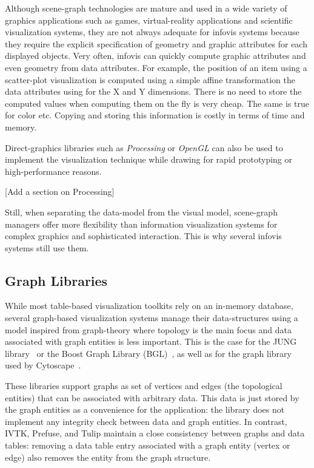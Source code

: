 Although scene-graph technologies are mature and used in a wide
variety of graphics applications such as games, virtual-reality
applications and scientific visualization systems, they are not always
adequate for infovis systems because they require
the explicit specification of geometry and graphic attributes for each
displayed objects.  Very often, infovis can quickly
compute graphic attributes and even geometry from data attributes.
For example, the position of an item using a scatter-plot visualization
is computed using a simple affine transformation the data attributes
using for the X and Y dimensions.  There is no need to store the
computed values when computing them on the fly is very cheap.  The
same is true for color etc.  Copying and storing this information is
costly in terms of time and memory.

Direct-graphics libraries such as \emph{Processing} or \emph{OpenGL}
can also be used to implement the visualization technique while
drawing for rapid prototyping or high-performance reasons.

[Add a section on Processing]

Still, when separating the data-model from the visual model,
scene-graph managers offer more flexibility than information
visualization systems for complex graphics and sophisticated
interaction.  This is why several infovis systems
still use them.


\subsection{Graph Libraries}

While most table-based visualization toolkits rely on an in-memory
database, several graph-based visualization systems manage their
data-structures using a model inspired from graph-theory where
topology is the main focus and data associated with graph entities is
less important.  This is the case for the JUNG library~\cite{jung2003}
or the Boost Graph Library (BGL)~\cite{BGL}, as well as for the graph
library used by Cytoscape~\cite{Cytoscape}.

These libraries support graphs as set of vertices and edges (the
topological entities) that can be associated with arbitrary data.
This data is just stored by the graph entities as a convenience for
the application: the library does not implement any integrity check
between data and graph entities.  In contrast, IVTK, Prefuse, and
Tulip maintain a close consistency between graphs and data tables:
removing a data table entry associated with a graph entity (vertex or
edge) also removes the entity from the graph structure.

